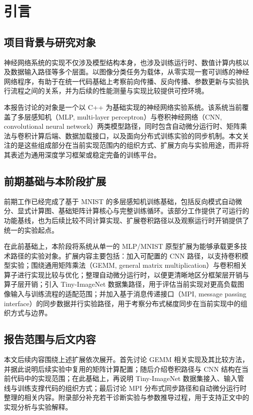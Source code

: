 \documentclass[a4paper,11pt,oneside]{article}
\begin{document}
\clearpage
\hypersetup{pageanchor=true}
\setcounter{page}{1}
\tableofcontents
\clearpage
{}
\setcounter{page}{1}
\pagestyle{fancy}

\section{引言}

\subsection{项目背景与研究对象}
神经网络系统的实现不仅涉及模型结构本身，也涉及训练运行时、数值计算内核以及数据输入路径等多个层面。以图像分类任务为载体，从零实现一套可训练的神经网络程序，有助于在统一代码基础上考察前向传播、反向传播、参数更新与实验执行流程之间的关系，并为后续的性能测量与实现比较提供可控环境。

本报告讨论的对象是一个以 C++ 为基础实现的神经网络实验系统。该系统当前覆盖了多层感知机（MLP, multi-layer perceptron）与卷积神经网络（CNN, convolutional neural network）两类模型路径，同时包含自动微分运行时、矩阵乘法与卷积计算后端、数据加载接口，以及面向分布式训练实验的同步机制。本文关注的是这些组成部分在当前实现范围内的组织方式、扩展方向与实验用途，而非将其表述为通用深度学习框架或稳定完备的训练平台。

\subsection{前期基础与本阶段扩展}
前期工作已经完成了基于 MNIST \cite{lecun1998} 的多层感知机训练基础，包括反向模式自动微分、显式计算图、基础矩阵计算核心与完整训练循环。该部分工作提供了可运行的功能基线，也为后续比较不同计算实现、扩展卷积路径以及观察运行时开销提供了统一的实验起点。

在此前基础上，本阶段将系统从单一的 MLP/MNIST 原型扩展为能够承载更多技术路径的实验对象。扩展内容主要包括：加入可配置的 CNN 路径，以支持卷积模型实验；围绕通用矩阵乘法（GEMM, general matrix multiplication）与卷积相关算子进行实现比较与优化；整理自动微分运行时，以便更清晰地区分框架层开销与算子层开销；引入 Tiny-ImageNet 数据集路径，用于评估当前实现对更高负载图像输入与训练流程的适配范围；并加入基于消息传递接口（MPI, message passing interface）的同步数据并行实验路径，用于考察分布式梯度同步在当前实现中的组织方式与边界。

\subsection{报告范围与后文内容}
本文后续内容围绕上述扩展依次展开。首先讨论 GEMM 相关实现及其比较方法，并据此说明后续实验中复用的矩阵计算配置；随后介绍卷积路径与 CNN 结构在当前代码中的实现范围；在此基础上，再说明 Tiny-ImageNet 数据集接入、输入管线与训练支撑代码的组织方式；最后讨论 MPI 分布式同步路径和自动微分运行时整理的相关内容。附录部分补充若干诊断实验与参数推导过程，用于支持正文中的实现分析与实验解释。
\end{document}
